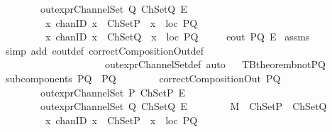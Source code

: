 \begin{isabellebody}
\ \ \ \ \ \ \ \ {\isachardoublequoteopen}out{\isacharunderscore}exprChannelSet\ Q\ ChSetQ\ E{\isachardoublequoteclose}\isanewline
\ \ \ \ \ \ \ \ {\isachardoublequoteopen}{\isasymforall}\ {\isacharparenleft}x\ {\isacharcolon}{\isacharcolon}chanID{\isacharparenright}{\isachardot}\ {\isacharparenleft}{\isacharparenleft}x\ {\isasymin}\ ChSetP{\isacharparenright}\ {\isasymlongrightarrow}\ {\isacharparenleft}x\ {\isasymin}\ {\isacharparenleft}loc\ PQ{\isacharparenright}{\isacharparenright}{\isacharparenright}{\isachardoublequoteclose}\isanewline
\ \ \ \ \ \ \ \ {\isachardoublequoteopen}{\isasymforall}\ {\isacharparenleft}x\ {\isacharcolon}{\isacharcolon}chanID{\isacharparenright}{\isachardot}\ {\isacharparenleft}{\isacharparenleft}x\ {\isasymin}\ ChSetQ{\isacharparenright}\ {\isasymlongrightarrow}\ {\isacharparenleft}x\ {\isasymin}\ {\isacharparenleft}loc\ PQ{\isacharparenright}{\isacharparenright}{\isacharparenright}{\isachardoublequoteclose}\isanewline
{}\ \ \ \ {\isachardoublequoteopen}{\isasymnot}\ eout\ PQ\ E{\isachardoublequoteclose}\isanewline
%
\isadelimproof
%
\endisadelimproof
%
\isatagproof
{}\isamarkupfalse%
\ assms\isanewline
{}\isamarkupfalse%
\ {\isacharparenleft}simp\ add{\isacharcolon}\ eout{\isacharunderscore}def\ correctCompositionOut{\isacharunderscore}def\ \isanewline
\ \ \ \ \ \ \ \ \ \ \ \ \ \ \ \ \ \ \ \ \ out{\isacharunderscore}exprChannelSet{\isacharunderscore}def{\isacharcomma}\ auto{\isacharparenright}%
\endisatagproof
{\isafoldproof}%
%
\isadelimproof
\ \isanewline
%
\endisadelimproof
\isanewline
{}\isamarkupfalse%
\ TBtheorem{}b{\isacharunderscore}notPQ{\isacharcolon}\isanewline
{}\ {\isachardoublequoteopen}subcomponents\ PQ\ {\isacharequal}\ {\isacharbraceleft}P{\isacharcomma}Q{\isacharbraceright}{\isachardoublequoteclose}\isanewline
\ \ \ \ \ \ \ \ {\isachardoublequoteopen}correctCompositionOut\ PQ{\isachardoublequoteclose}\isanewline
\ \ \ \ \ \ \ \ {\isachardoublequoteopen}out{\isacharunderscore}exprChannelSet\ P\ ChSetP\ E{\isachardoublequoteclose}\isanewline
\ \ \ \ \ \ \ \ {\isachardoublequoteopen}out{\isacharunderscore}exprChannelSet\ Q\ ChSetQ\ E{\isachardoublequoteclose}\isanewline
\ \ \ \ \ \ \ \ {\isachardoublequoteopen}M\ {\isacharequal}\ ChSetP\ {\isasymunion}\ ChSetQ{\isachardoublequoteclose}\isanewline
\ \ \ \ \ \ \ \ {\isachardoublequoteopen}{\isasymforall}\ {\isacharparenleft}x\ {\isacharcolon}{\isacharcolon}chanID{\isacharparenright}{\isachardot}\ {\isacharparenleft}{\isacharparenleft}x\ {\isasymin}\ ChSetP{\isacharparenright}\ {\isasymlongrightarrow}\ {\isacharparenleft}x\ {\isasymin}\ {\isacharparenleft}loc\ PQ{\isacharparenright}{\isacharparenright}{\isacharparenright}{\isachardoublequoteclose}\isanewline

\end{isabellebody}
